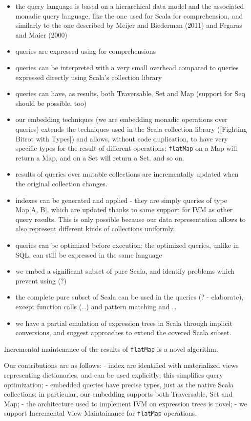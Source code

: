 \documentclass[preprint,authoryear,10pt]{sigplanconf}
\begin{document}
\begin{itemize}
\item
  the query language is based on a hierarchical data model and the
  associated monadic query language, like the one used for Scala for
  comprehension, and similarly to the one described by Meijer and
  Biederman (2011) and Fegaras and Maier (2000)
\item
  queries are expressed using for comprehensions
\item
  queries can be interpreted with a very small overhead compared to
  queries expressed directly using Scala's collection library
\item
  queries can have, as results, both Traversable, Set and Map (support
  for Seq should be possible, too)
\item
  our embedding techniques (we are embedding monadic operations over
  queries) extends the techniques used in the Scala collection library
  ({[}Fighting Bitrot with Types{]}) and allows, without code
  duplication, to have very specific types for the result of different
  operations; \texttt{flatMap} on a Map will return a Map, and on a Set
  will return a Set, and so on.
\item
  results of queries over mutable collections are incrementally updated
  when the original collection changes.
\item
  indexes can be generated and applied - they are simply queries of type
  Map{[}A, B{]}, which are updated thanks to same support for IVM as
  other query results. This is only possible because our data
  representation allows to also represent different kinds of collections
  uniformly.
\item
  queries can be optimized before execution; the optimized queries,
  unlike in SQL, can still be expressed in the same language
\item
  we embed a significant subset of pure Scala, and identify problems
  which prevent using (?)
\item
  the complete pure subset of Scala can be used in the queries (? -
  elaborate), except function calls (\ldots{}) and pattern matching and
  \ldots{}
\item
  we have a partial emulation of expression trees in Scala through
  implicit conversions, and suggest approaches to extend the covered
  Scala subset.
\end{itemize}
Incremental maintenance of the results of \texttt{flatMap} is a novel
algorithm.

Our contributions are as follows: - index are identified with
materialized views representing dictionaries, and can be used
explicitly; this simplifies query optimization; - embedded queries have
precise types, just as the native Scala collections; in particular, our
embedding supports both Traversable, Set and Map; - the architecture
used to implement IVM on expression trees is novel; - we support
Incremental View Maintainance for \texttt{flatMap} operations.
\end{document}
